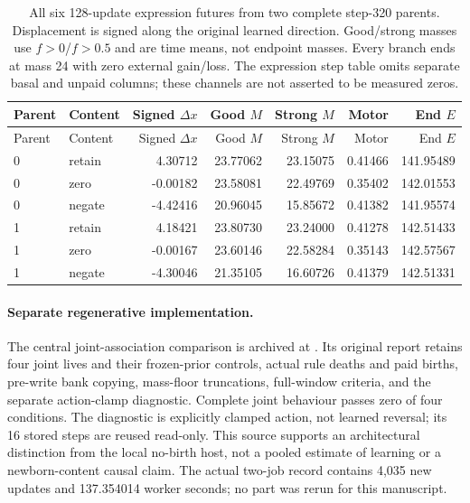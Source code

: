 \begin{longtable}{llrrrrr}
\caption{All six 128-update expression futures from two complete step-320 parents. Displacement is signed along the original learned direction. Good/strong masses use $f>0$/$f>0.5$ and are time means, not endpoint masses. Every branch ends at mass 24 with zero external gain/loss. The expression step table omits separate basal and unpaid columns; these channels are not asserted to be measured zeros.}\label{tab:motor-expression}\\
\toprule
Parent & Content & Signed $\Delta x$ & Good $M$ & Strong $M$ & Motor & End $E$ \\
\midrule
\endfirsthead
\toprule
Parent & Content & Signed $\Delta x$ & Good $M$ & Strong $M$ & Motor & End $E$ \\
\midrule
\endhead
0 & retain & 4.30712 & 23.77062 & 23.15075 & 0.41466 & 141.95489 \\
0 & zero & -0.00182 & 23.58081 & 22.49769 & 0.35402 & 142.01553 \\
0 & negate & -4.42416 & 20.96045 & 15.85672 & 0.41382 & 141.95574 \\
1 & retain & 4.18421 & 23.80730 & 23.24000 & 0.41278 & 142.51433 \\
1 & zero & -0.00167 & 23.60146 & 22.58284 & 0.35143 & 142.57567 \\
1 & negate & -4.30046 & 21.35105 & 16.60726 & 0.41379 & 142.51331 \\
\bottomrule
\end{longtable}
\endgroup
\paragraph{Separate regenerative implementation.} The central joint-association comparison is archived at . Its original report retains four joint lives and their frozen-prior controls, actual rule deaths and paid births, pre-write bank copying, mass-floor truncations, full-window criteria, and the separate action-clamp diagnostic. Complete joint behaviour passes zero of four conditions. The diagnostic is explicitly clamped action, not learned reversal; its 16 stored steps are reused read-only. This source supports an architectural distinction from the local no-birth host, not a pooled estimate of learning or a newborn-content causal claim. The actual two-job record contains 4,035 new updates and 137.354014 worker seconds; no part was rerun for this manuscript.
